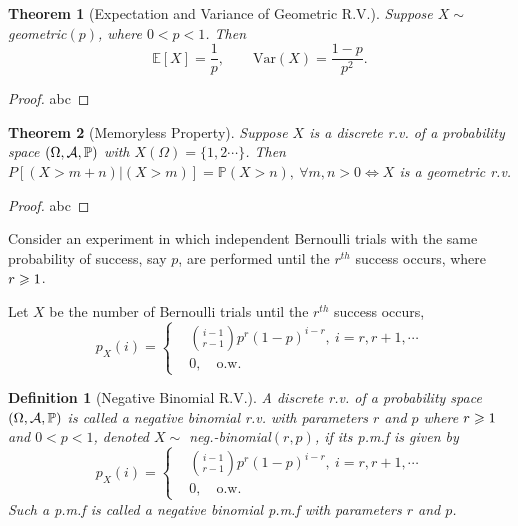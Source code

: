 \documentclass[openany,12pt]{book}
\newtheorem{theorem}{Theorem}[chapter]
\newtheorem{definition}{Definition}[chapter]
\begin{document}
\begin{theorem}[Expectation and Variance of Geometric R.V.]
Suppose $X\sim$ geometric$(p)$, where $0<p<1$. 
Then
$$
\mathbb{E}[X]=\frac{1}{p},\qquad
\mathrm{Var}(X)=\frac{1-p}{p^2}.
$$
\end{theorem}

\begin{proof}
  abc
\end{proof}

\begin{theorem}[Memoryless Property]
Suppose $X$ is a discrete r.v. of a probability space $(\Omega,\mathcal{A},\mathbb{P})$ with $X(\Omega)=\{1,2\cdots\}$. Then $P[(X>m+n)|(X>m)]=\mathbb{P}(X>n),\ \forall m,n>0 \Leftrightarrow X$ is a geometric r.v.
\end{theorem}

\begin{proof}
  abc
\end{proof}

Consider an experiment in which independent Bernoulli trials with the same
probability of success, say $p$, are performed until the $r^{th}$ success occurs, where $r\geqslant1$.

Let $X$ be the number of Bernoulli trials until the  $r^{th}$ success occurs,
$$
p_X (i)=
\left\{\begin{aligned}
&\binom {i-1} {r-1} p^r(1-p)^{i-r},\   i=r,r+1,\cdots\\
&0,\quad\text{o.w.}
\end{aligned}        
\right.   
$$

\begin{definition}[Negative Binomial R.V.]
A discrete r.v. of a probability space $(\Omega,\mathcal{A},\mathbb{P})$ is called a negative binomial r.v. with parameters $r$ and $p$ where $r\geqslant1$ and $0<p<1$, denoted $X\sim$ neg.-binomial$(r,p)$, if its p.m.f is given by
$$
p_X (i)=
\left\{\begin{aligned}
&\binom {i-1} {r-1} p^r(1-p)^{i-r},\   i=r,r+1,\cdots\\
&0,\quad\text{o.w.}
\end{aligned}        
\right.   
$$
Such a p.m.f is called a negative binomial p.m.f with parameters $r$ and $p$.
\end{definition}
\end{document}
